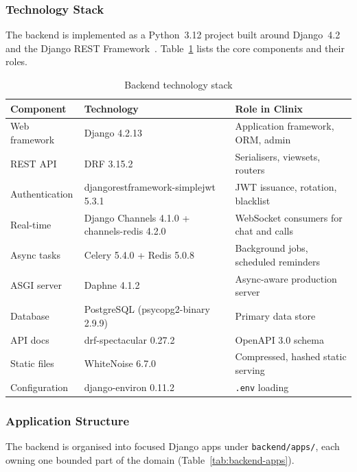 \subsubsection*{Technology Stack}

The backend is implemented as a Python~3.12 project built around Django~4.2~\cite{django_docs} and the Django REST Framework~\cite{drf_docs}. Table~\ref{tab:backend-stack} lists the core components and their roles.

\begin{table}[H]
\centering
\caption{Backend technology stack}
\label{tab:backend-stack}
\small
\begin{tabularx}{\textwidth}{|p{3.5cm}|p{3.5cm}|X|}
\hline
\textbf{Component} & \textbf{Technology} & \textbf{Role in Clinix} \\ \hline

Web framework & Django 4.2.13 & Application framework, ORM, admin \\ \hline
REST API & DRF 3.15.2 & Serialisers, viewsets, routers \\ \hline
Authentication & djangorestframework-simplejwt 5.3.1 & JWT issuance, rotation, blacklist \\ \hline
Real-time & Django Channels 4.1.0 + channels-redis 4.2.0 & WebSocket consumers for chat and calls \\ \hline
Async tasks & Celery 5.4.0 + Redis 5.0.8 & Background jobs, scheduled reminders \\ \hline
ASGI server & Daphne 4.1.2 & Async-aware production server \\ \hline
Database & PostgreSQL (psycopg2-binary 2.9.9) & Primary data store \\ \hline
API docs & drf-spectacular 0.27.2 & OpenAPI 3.0 schema \\ \hline
Static files & WhiteNoise 6.7.0 & Compressed, hashed static serving \\ \hline
Configuration & django-environ 0.11.2 & \texttt{.env} loading \\ \hline

\end{tabularx}
\end{table}

\subsubsection*{Application Structure}

The backend is organised into focused Django apps under \texttt{backend/apps/}, each owning one bounded part of the domain (Table~\ref{tab:backend-apps}).

